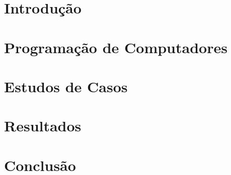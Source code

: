 \documentclass[relatorio]{tex/unemat-comp}
\begin{document}
\chapter*{Introdução}\label{chap:intro}


\chapter{Programação de Computadores}\label{chap:prog}


\chapter{Estudos de Casos}\label{chap:cases}


\chapter{Resultados}\label{chap:results}


\chapter{Conclusão}\label{chap:conclusion}




\cleardoublepage


\arial
\printbibliography[heading=bibintoc,title=\refname]


\apendices{}





\end{document}
